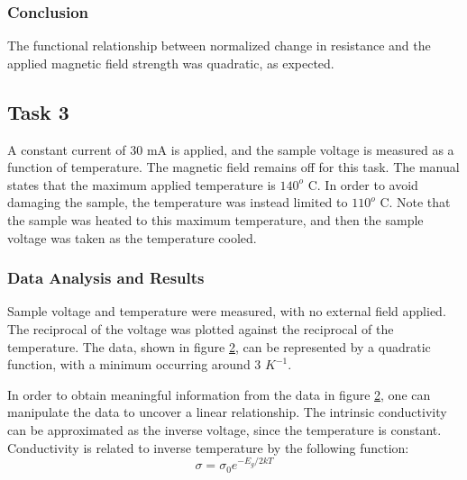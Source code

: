 \documentclass[a4paper]{article}
\begin{document}
\begin{figure}[H]
\centering
\label{task22plot}
\end{figure}

\subsubsection{Conclusion}
The functional relationship between normalized change in resistance and the applied magnetic field strength was quadratic, as expected.

\subsection{Task 3}

\qq A constant current of 30 mA is applied, and the sample voltage is
measured as a function of temperature. The magnetic field
remains off for this task. The manual states that the maximum
applied temperature is $140^o$ C. In order to avoid damaging the sample, the temperature was instead limited to $110^o$ C. Note that the sample 
was heated to this maximum temperature, and then the sample voltage was taken as the temperature cooled.

\subsubsection{Data Analysis and Results}
\qq Sample voltage and temperature were measured, with no external field applied. The reciprocal of the voltage was plotted against the 
reciprocal of the temperature. The data, shown in figure \ref{task23plot}, can be represented by a quadratic function, with a minimum occurring around 3 $K^{-1}$.

\begin{figure}[H]
\centering
\label{task23plot}
\end{figure}

In order to obtain meaningful information from the data in figure \ref{task23plot}, one can manipulate the data to uncover a linear relationship. The intrinsic conductivity can be approximated as the inverse voltage, since the temperature is constant. Conductivity is related to inverse temperature by the following function:
$$\sigma = \sigma_0 e^{-E_g/2kT}$$
\end{document}
